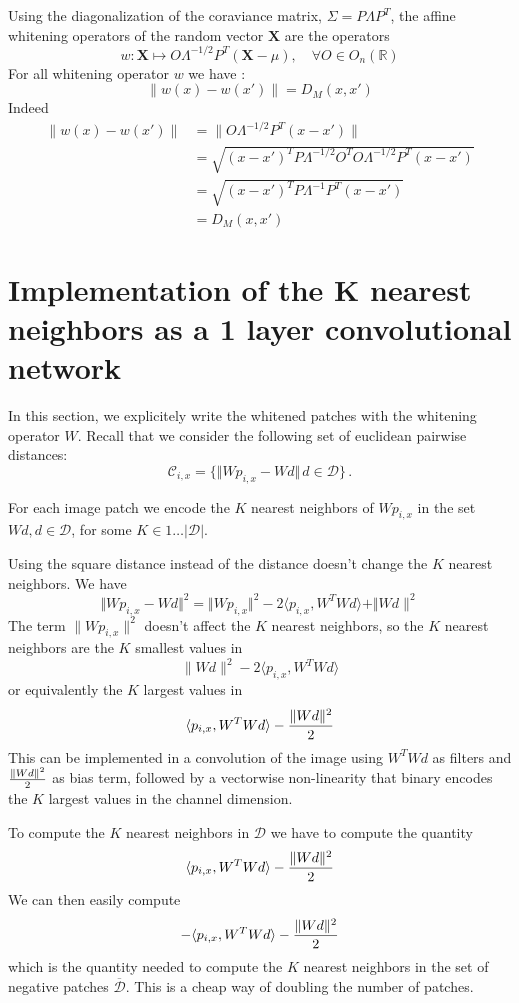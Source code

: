 \documentclass{article}
\begin{document}
Using the diagonalization of the coraviance matrix,  $\Sigma = P\Lambda P^T$, the affine whitening operators of the random vector $\mathbf{X}$ are the operators 
\begin{equation}
\label{whitening}
     w : \mathbf{X} \mapsto O \Lambda^{-1/2} P^T (\mathbf{X} - \mu), \quad \forall O \in  O_n (\mathbb{R})
\end{equation}
For all whitening operator $w$ we have :
\[
\|w(x) - w(x')\| = D_M(x, x')
\]
Indeed 
\begin{align*}
  \|w(x) - w(x')\|
    &= \| O \Lambda^{-1/2} P^T ( x - x') \|\\
    &= \sqrt{(x - x')^T P \Lambda^{-1/2} O^T O \Lambda^{-1/2} P^T (x - x') }\\
    &=  \sqrt{ (x - x')^T P \Lambda^{-1} P^T (x - x')} \\
    &= D_M(x, x') 
\end{align*}

\section{Implementation of the K nearest neighbors as a 1 layer convolutional network}

In this section, we explicitely write the whitened patches with the whitening operator $W$.
Recall that  we consider the following set of euclidean pairwise distances:
\[\mathcal{C}_{i, x} =\{\Vert W p_{i, x} - W d \Vert\, d\in\mathcal{D} \}\,.\]

For each image patch we encode the $K$ nearest neighbors of $W p_{i,x}$ in the set $Wd, d \in \mathcal{D}$, for some $ K \in 1 \ldots|\mathcal{D}| $.

Using the square distance instead of the distance doesn't change the $K$ nearest neighbors.
We have 
\[ \Vert Wp_{i,x} - Wd \Vert^2 = \Vert Wp_{i,x} \Vert^2 - 2 \langle p_{i,x}, W^T W d \rangle + \Vert Wd\|^2 \]
The term $\|Wp_{i,x}\|^2$ doesn't affect the $K$ nearest neighbors, so the $K$ nearest neighbors are the $K$ smallest values in
\[
        \|Wd \|^2 - 2\langle p_{i,x}, W^T W d \rangle
\]
or equivalently the  $K$ largest values in
\[
        \langle p_{i,x}, W^T W d \rangle - {\|Wd \|^2 \over 2} 
\]
This can be implemented in a convolution of the image using $W^T W d$ as filters and ${\|Wd \|^2 \over 2}$ as bias term, followed by a vectorwise non-linearity that binary encodes the $K$ largest values in the channel dimension.

To compute the $K$ nearest neighbors in $\mathcal{D}$ we have to compute the quantity
\[ \langle p_{i,x}, W^T W d \rangle - {\|Wd \|^2 \over 2} \]
We can then easily compute 
\[ - \langle p_{i,x}, W^T W d \rangle - {\|Wd \|^2 \over 2} \] which is the quantity needed to compute the $K$ nearest neighbors in the set of negative patches $\overline{\mathcal{D}}$.
This is a cheap way of doubling the number of patches.
\end{document}
